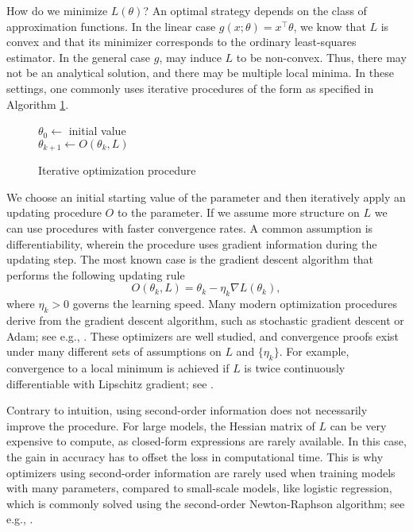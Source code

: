How do we minimize $L(\theta)$? An optimal strategy depends on the class of
approximation functions. In the linear case $g(x; \theta) = x^\top \theta$, we know that
$L$ is convex and that its minimizer corresponds to the ordinary least-squares
estimator. In the general case $g$, may induce $L$ to be non-convex. Thus, there may not
be an analytical solution, and there may be multiple local minima. In these settings,
one commonly uses iterative procedures of the form as specified in Algorithm
\ref{alg:optimizer}.
\vspace{-1em}
\begin{figure}[!ht]
    \centering
    \begin{minipage}{.7\linewidth}
        \begin{algorithm}[H]
            \begin{algorithmic}[1]
                \State $\theta_0 \gets$ initial value
                \\
                $\theta_{k+1} \gets O(\theta_k, L)$
                \EndWhile
            \end{algorithmic}
        \caption{Iterative optimization procedure}
        \label{alg:optimizer}
        \end{algorithm}
    \end{minipage}
\end{figure}
We choose an initial starting value of the parameter and then iteratively apply an
updating procedure $O$ to the parameter. If we assume more structure on $L$ we can use
procedures with faster convergence rates. A common assumption is differentiability,
wherein the procedure uses gradient information during the updating step. The most known
case is the gradient descent algorithm that performs the following updating rule
\[
    O(\theta_k, L) = \theta_k - \eta_k \nabla L(\theta_k),
\]
where $\eta_k > 0$ governs the learning speed. Many modern optimization procedures
derive from the gradient descent algorithm, such as stochastic gradient descent or Adam;
see e.g., \cite{Kingma.2014}. These optimizers are well studied, and convergence proofs
exist under many different sets of assumptions on $L$ and $\{\eta_k\}$. For example,
convergence to a local minimum is achieved if $L$ is twice continuously differentiable
with Lipschitz gradient; see \cite{Lee.2016}.

Contrary to intuition, using second-order information does not necessarily
improve the procedure. For large models, the Hessian matrix of $L$ can be very expensive
to compute, as closed-form expressions are rarely available. In this case, the gain in
accuracy has to offset the loss in computational time. This is why optimizers using
second-order information are rarely used when training models with many parameters,
compared to small-scale models, like logistic regression, which is commonly solved using
the second-order Newton-Raphson algorithm; see e.g., \cite{Sklearn}.


